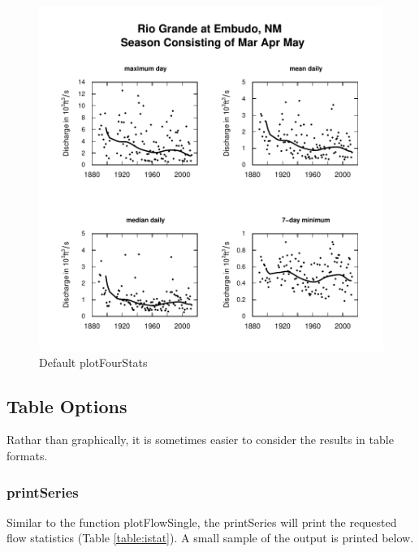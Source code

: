 \documentclass[a4paper,11pt]{article}
\begin{document}
\begin{figure}[ht]
\begin{center}

\includegraphics{EGRET-figplotFourStats}
\end{center}
\caption{Default plotFourStats}
\label{fig:plotFourStats}
\end{figure}

\FloatBarrier
\subsection{Table Options}
\label{sec:tableOptions}
Rathar than graphically, it is sometimes easier to consider the results in table formats. 

\subsubsection{printSeries}
\label{sec:printSeries}
Similar to the function plotFlowSingle, the printSeries will print the requested flow statistics (Table \ref{table:istat}). A small sample of the output is printed below.
\end{document}
